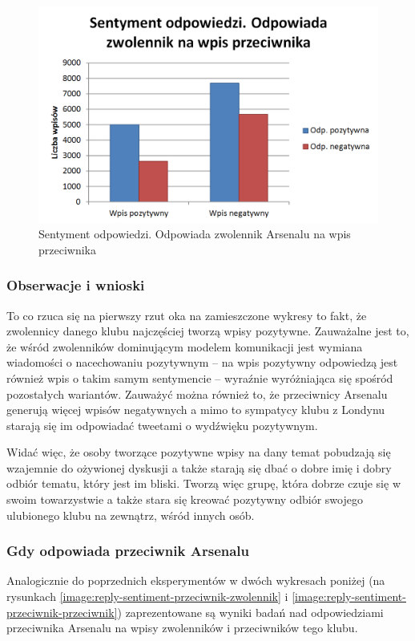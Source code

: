 \begin{figure}[ht!]
\centering
\includegraphics[width=120mm]{img/reply-sentiment-zwolennik-przeciwnik.png}
\caption{Sentyment odpowiedzi. Odpowiada zwolennik Arsenalu na wpis przeciwnika}
\label{image:reply-sentiment-zwolennik-przeciwnik}
\end{figure}



\subsubsection{Obserwacje i wnioski}
To co rzuca się na pierwszy rzut oka na zamieszczone wykresy to fakt, że 
zwolennicy danego klubu najczęściej tworzą wpisy pozytywne. Zauważalne jest to,
że wśród zwolenników dominującym modelem komunikacji jest wymiana wiadomości
o nacechowaniu pozytywnym -- na wpis pozytywny odpowiedzą jest również wpis o 
takim samym sentymencie -- wyraźnie wyróżniająca się spośród pozostałych
wariantów.
Zauważyć można również to, że przeciwnicy Arsenalu generują więcej wpisów 
negatywnych a mimo to sympatycy klubu z Londynu starają się im odpowiadać
tweetami o wydźwięku pozytywnym.

Widać więc, że osoby tworzące pozytywne wpisy na dany temat pobudzają się
wzajemnie do ożywionej dyskusji a także starają się dbać o dobre imię
i dobry odbiór tematu, który jest im bliski. Tworzą więc grupę, która
dobrze czuje się w swoim towarzystwie a także stara się kreować
pozytywny odbiór swojego ulubionego klubu na zewnątrz, wśród innych osób.

\subsubsection{Gdy odpowiada przeciwnik Arsenalu}
Analogicznie do poprzednich eksperymentów w dwóch wykresach poniżej (na 
rysunkach \ref{image:reply-sentiment-przeciwnik-zwolennik} i 
\ref{image:reply-sentiment-przeciwnik-przeciwnik}) zaprezentowane są
wyniki badań nad odpowiedziami przeciwnika Arsenalu na wpisy zwolenników
i przeciwników tego klubu.

